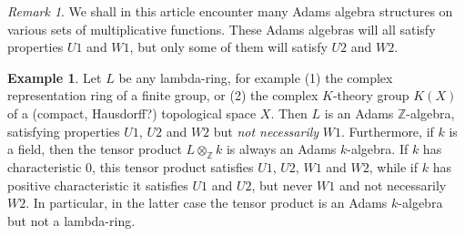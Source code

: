 \documentclass[a4paper]{article}
\theoremstyle{definition}
\newtheorem{example}{Example}[section]
\theoremstyle{remark}
\newtheorem*{remark}{Remark}
\newcommand{\ad}[1]{\text{Ad}^{#1}}
\newcommand{\Z}{\mathbb{Z}}
\newcommand{\C}{\mathbb{C}}
\begin{document}



\begin{remark}
We shall in this article encounter many Adams algebra structures on various sets of multiplicative functions. These Adams algebras will all satisfy properties $U1$ and $W1$, but only some of them will satisfy $U2$ and $W2$.
\end{remark}


\begin{example}
Let $L$ be any lambda-ring, for example (1) the complex representation ring of a finite group, or (2) the complex $K$-theory group $K(X)$ of a (compact, Hausdorff?) topological space $X$. Then $L$ is an Adams $\mathbb{Z}$-algebra, satisfying properties $U1$, $U2$ and $W2$ but \emph{not necessarily} $W1$. Furthermore, if $k$ is a field, then the tensor product $L \otimes_{\mathbb{Z}} k$ is always an Adams $k$-algebra. If $k$ has characteristic 0, this tensor product satisfies $U1$, $U2$, $W1$ and $W2$, while if $k$ has positive characteristic it satisfies $U1$ and $U2$, but never $W1$ and not necessarily $W2$. In particular, in the latter case the tensor product is an Adams $k$-algebra but not a lambda-ring.
\end{example}
\end{document}
